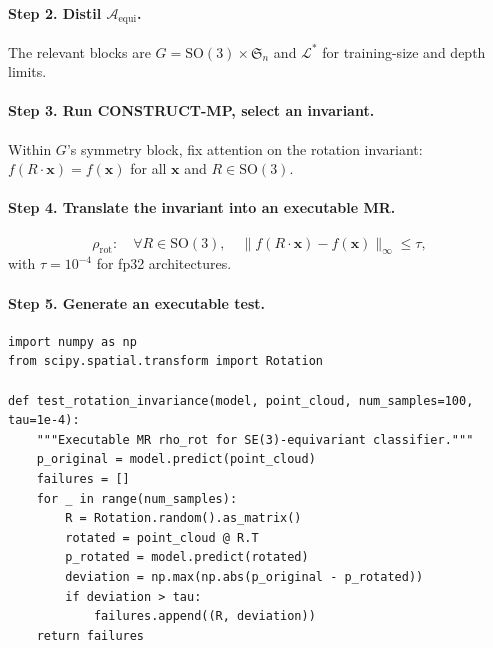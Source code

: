 \documentclass[manuscript]{acmart}
\begin{document}
\paragraph{Step 2. Distil $\mathcal{A}_{\mathrm{equi}}$.} The relevant blocks are $G = \mathrm{SO}(3)\times\mathfrak{S}_n$ and $\mathcal{L}^{*}$ for training-size and depth limits.

\paragraph{Step 3. Run CONSTRUCT-MP, select an invariant.} Within $G$'s symmetry block, fix attention on the rotation invariant: $f(R \cdot \mathbf{x}) = f(\mathbf{x})$ for all $\mathbf{x}$ and $R \in \mathrm{SO}(3)$.

\paragraph{Step 4. Translate the invariant into an executable MR.}
\begin{equation}
\label{eq:rho-rot}
\rho_{\mathrm{rot}}: \quad \forall R \in \mathrm{SO}(3), \quad \big\| f(R \cdot \mathbf{x}) - f(\mathbf{x}) \big\|_\infty \le \tau,
\end{equation}
with $\tau = 10^{-4}$ for fp32 architectures.

\paragraph{Step 5. Generate an executable test.}
\begin{lstlisting}[style=pythonstyle, caption={Executable MR $\rho_{\mathrm{rot}}$ for SE(3)-equivariant classifier.}]
import numpy as np
from scipy.spatial.transform import Rotation

def test_rotation_invariance(model, point_cloud, num_samples=100, tau=1e-4):
    """Executable MR rho_rot for SE(3)-equivariant classifier."""
    p_original = model.predict(point_cloud)
    failures = []
    for _ in range(num_samples):
        R = Rotation.random().as_matrix()
        rotated = point_cloud @ R.T
        p_rotated = model.predict(rotated)
        deviation = np.max(np.abs(p_original - p_rotated))
        if deviation > tau:
            failures.append((R, deviation))
    return failures
\end{lstlisting}
\end{document}
